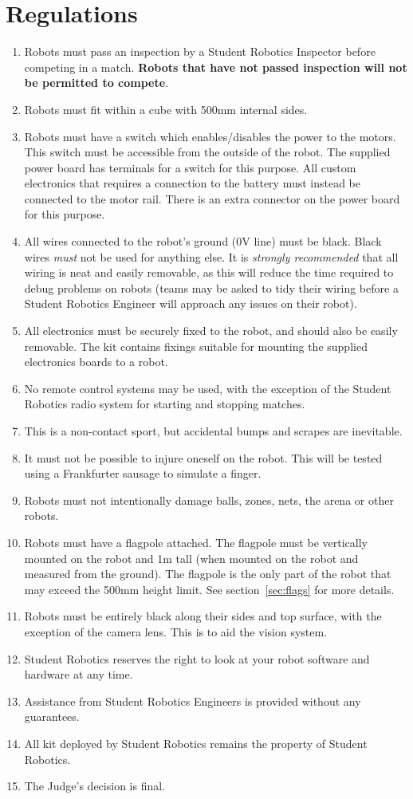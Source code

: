 \section {Regulations}
\label{regs}

\begin{enumerate}
\item Robots must pass an inspection by a Student Robotics Inspector before competing in a match.  \textbf{Robots that have not passed inspection will not be permitted to compete}.
\item Robots must fit within a cube with 500mm internal sides.
\item Robots must have a switch which enables/disables the power to the motors.  This switch must be accessible from the outside of the robot.  The supplied power board has terminals for a switch for this purpose.  All custom electronics that requires a connection to the battery must instead be connected to the motor rail.  There is an extra connector on the power board for this purpose.
\item All wires connected to the robot's ground (0V line) must be black.  Black wires \emph{must} not be used for anything else.  It is \emph{strongly recommended} that all wiring is neat and easily removable, as this will reduce the time required to debug problems on robots (teams may be asked to tidy their wiring before a Student Robotics Engineer will approach any issues on their robot).
\item All electronics must be securely fixed to the robot, and should also be easily removable.  The kit contains fixings suitable for mounting the supplied electronics boards to a robot.
\item No remote control systems may be used, with the exception of the Student Robotics radio system for starting and stopping matches.
\item This is a non-contact sport, but accidental bumps and scrapes are inevitable.
\item It must not be possible to injure oneself on the robot.  This will be tested using a Frankfurter sausage to simulate a finger.
\item Robots must not intentionally damage balls, zones, nets, the arena or other robots.
\item Robots must have a flagpole attached.  The flagpole must be vertically mounted on the robot and 1m tall (when mounted on the robot and measured from the ground).  The flagpole is the only part of the robot that may exceed the 500mm height limit.  See section~\ref{sec:flags} for more details.
\item Robots must be entirely black along their sides and top surface, with the exception of the camera lens.  This is to aid the vision system.
\item Student Robotics reserves the right to look at your robot software and hardware at any time.
\item Assistance from Student Robotics Engineers is provided without any guarantees.
\item All kit deployed by Student Robotics remains the property of Student Robotics.
\item The Judge's decision is final.
\end{enumerate}
